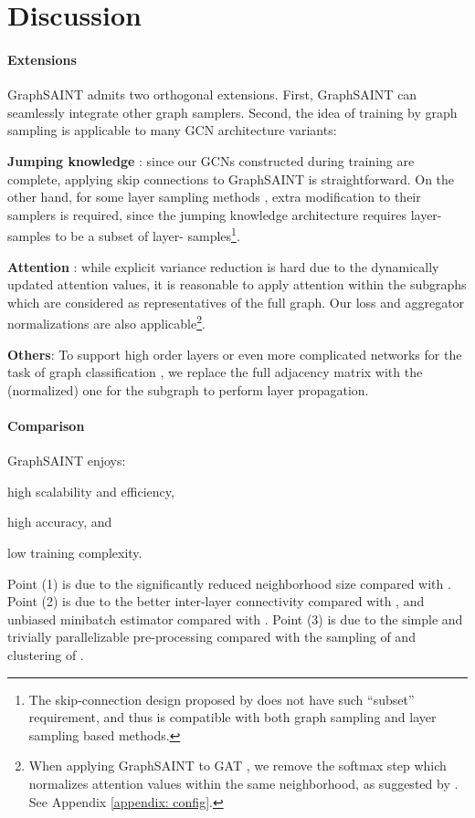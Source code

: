 \documentclass{article} \usepackage{iclr2020_conference,times}
\newcommand{\graphsaint}{{\fontfamily{lmtt}\selectfont GraphSAINT}}
\begin{document}
 \section{Discussion\label{sec: discussion}}




\paragraph{Extensions} {\graphsaint} admits two orthogonal extensions. 
First, {\graphsaint} can seamlessly integrate other graph samplers. 
Second, the idea of training by graph sampling is applicable to many GCN architecture variants:
\begin{enumerate*}
\item \textbf{Jumping knowledge} \citep{jk-net}: since our GCNs constructed during training are complete, applying skip connections to {\graphsaint} is straightforward. On the other hand, for some layer sampling methods \citep{fastgcn,as-gcn}, extra modification to their samplers is required, since the jumping knowledge architecture requires layer- samples to be a subset of layer- samples\footnote{The skip-connection design proposed by \cite{as-gcn} does not have such ``subset'' requirement, and thus is compatible with both graph sampling and layer sampling based methods.}. 
\item \textbf{Attention} \citep{gat,dna,gaan}: while explicit variance reduction is hard due to the dynamically updated attention values, it is reasonable to apply attention within the subgraphs which are considered as representatives of the full graph. Our loss and aggregator normalizations are also applicable\footnote{When applying {\graphsaint} to GAT \citep{gat}, we remove the softmax step which normalizes attention values within the same neighborhood, as suggested by \cite{as-gcn}. See Appendix \ref{appendix: config}.}.
\item \textbf{Others}: To support high order layers \citep{high-order-1,high-order-2,high-order-3} or even more complicated networks for the task of graph classification \citep{diff-pool}, we replace the full adjacency matrix  with the (normalized) one for the subgraph  to perform layer propagation. 
\end{enumerate*}




\paragraph{Comparison} {\graphsaint} enjoys: 
\begin{enumerate*}
\item high scalability and efficiency,\item high accuracy, and\item low training complexity.\end{enumerate*}
Point (1) is due to the significantly reduced neighborhood size compared with \cite{graphsage,gcn_web,s-gcn}. 
Point (2) is due to the better inter-layer connectivity compared with \cite{fastgcn}, and unbiased minibatch estimator compared with \cite{cluster-gcn}. 
Point (3) is due to the simple and trivially parallelizable pre-processing compared with the sampling of \cite{as-gcn} and clustering of \cite{cluster-gcn}. 
%
\end{document}
